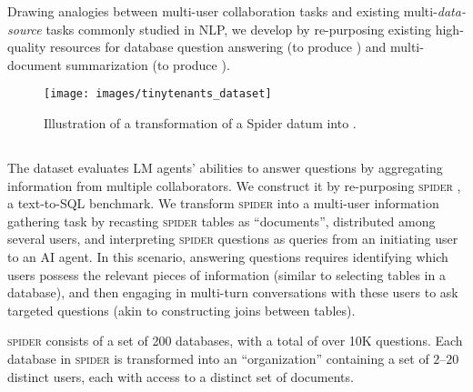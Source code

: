 Drawing analogies between multi-user collaboration tasks and existing multi-\emph{data-source} tasks commonly studied in NLP, we develop \asyncfw{} by re-purposing existing high-quality resources for database question answering (to produce \dataspider{}) and multi-document summarization (to produce \datanews{}).


\begin{figure*}
    \centering
    \texttt{[image: images/tinytenants\_dataset]}
    \caption{Illustration of a transformation of a Spider datum into \dataspider{}.}
    \label{fig:data-transformation}
\end{figure*}


\subsection{\dataspider{}}
The \dataspider{} dataset 
evaluates LM agents' abilities to answer questions by aggregating information from multiple collaborators.
We construct it by re-purposing \textsc{spider} \cite{yu2018spider}, a text-to-SQL benchmark. We transform \textsc{spider} into a multi-user information gathering task by recasting \textsc{spider} tables as ``documents'', distributed among several users, and interpreting
\textsc{spider} questions
as queries from an initiating user to an AI agent. 
In this scenario, answering questions requires identifying which users possess the relevant pieces of information (similar to selecting tables in a database), and then engaging in multi-turn conversations with these users to ask targeted questions (akin to constructing joins between tables). 




\textsc{spider} consists of a set of 200 databases, with a total of over 10K questions. %
Each database in \textsc{spider} is transformed into an ``organization'' containing a set of $2$--$20$ distinct users, each with access to a distinct set of documents.



